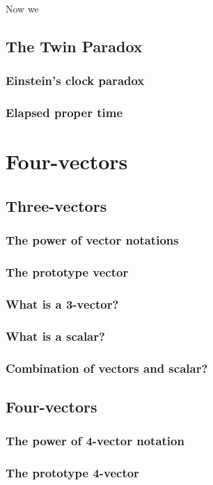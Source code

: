 \documentclass[a4paper,11pt]{article}
\numberwithin{equation}{section}
\begin{document}
 Now we 
 \subsection{The Twin Paradox}
 \subsubsection{Einstein's clock paradox}
 \subsubsection{Elapsed proper time}
 
 \section{Four-vectors}
 \subsection{Three-vectors}
 \subsubsection{The power of vector notations}
 \subsubsection{The prototype vector}
 \subsubsection{What is a 3-vector?}
 \subsubsection{What is a scalar?}
 \subsubsection{Combination of vectors and scalar?}
 
 \subsection{Four-vectors}
 \subsubsection{The power of 4-vector notation}
 \subsubsection{The prototype 4-vector}
\end{document}
